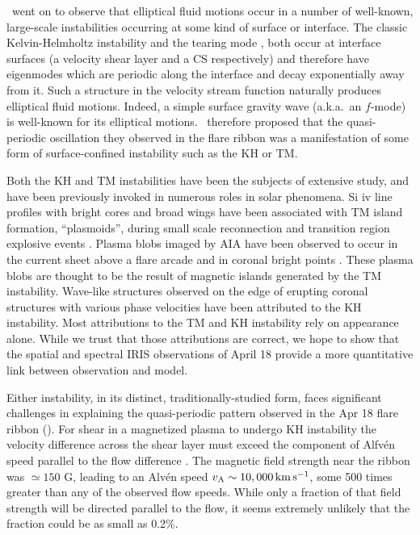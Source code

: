 \BLQ\ went on to observe that elliptical fluid motions occur in a number of well-known, large-scale instabilities occurring at some kind of surface or interface.  The classic Kelvin-Helmholtz instability \citep[KH,][]{Chandrasekhar1961} and the tearing mode \citep[{T}M,][]{Furth1963}, both occur at interface surfaces (a velocity shear layer and a CS respectively) and therefore have eigenmodes which are periodic along the interface and decay exponentially away from it.  Such a structure in the velocity stream function naturally produces elliptical fluid motions.  Indeed, a simple surface gravity wave (a.k.a.\ an $f$-mode) is well-known for its elliptical motions.  \BLQ\ therefore proposed that the quasi-periodic oscillation they observed in the flare ribbon was a manifestation of some form of surface-confined instability such as the KH or {T}M.

Both the KH and {T}M instabilities have been the subjects of extensive study, and have been previously invoked in numerous roles in solar phenomena. Si {\sc iv} line profiles with bright cores and broad wings have been associated with TM island formation, ``plasmoids'', during small scale reconnection and transition region explosive events \citep{Innes2015}.  Plasma blobs imaged by AIA \citep{AIA_instrument} have been observed to occur in the current sheet above a flare arcade \citep{Takasao2012,Takasao2016} and in coronal bright points \citep{Zhang2016}.  These plasma blobs are thought to be the result of magnetic islands generated by the TM instability. Wave-like structures observed on the edge of erupting coronal structures \citep{Ofman2011,Foullon2011,Foullon2013} with various phase velocities have been attributed to the KH instability. Most attributions to the TM and KH instability rely on appearance alone.  While we trust that those attributions are correct, we hope to show that the spatial and spectral IRIS observations of April 18 provide a more quantitative link between observation and model.


 

Either instability, in its distinct, traditionally-studied form, faces significant challenges in explaining the quasi-periodic pattern observed in the Apr 18 flare ribbon (\BLQ).  For shear in a magnetized plasma to undergo KH instability the velocity difference across the shear layer must exceed the component of Alfv\'en speed parallel to the flow difference \citep{Chandrasekhar1961}.  The magnetic field strength near the ribbon was $\simeq 150$ G, leading to an Alv\'en speed $v_{\rm A}\sim 10,000\, {\rm km\, s^{-1}}$, some 500 times greater than any of the observed flow speeds.  While only a fraction of that field strength will be directed parallel to the flow, it seems extremely unlikely that the fraction could be as small as 0.2\%.  

